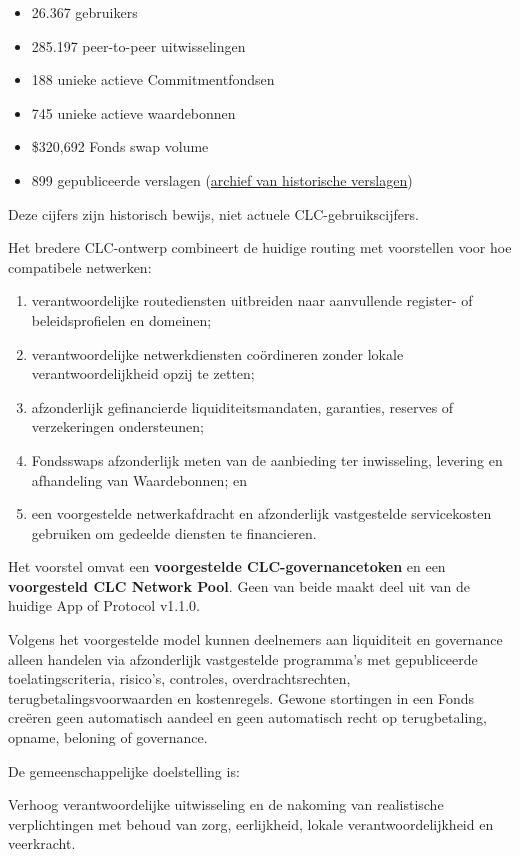 \documentclass[11pt]{article}
\begin{document}
\begin{itemize}[leftmargin=*]
\item 26.367 gebruikers
\item 285.197 peer-to-peer uitwisselingen
\item 188 unieke actieve Commitmentfondsen
\item 745 unieke actieve waardebonnen
\item \$320,692 Fonds swap volume
\item 899 gepubliceerde verslagen (\href{https://sarafu.network/reports}{archief van historische verslagen})
\end{itemize}
Deze cijfers zijn historisch bewijs, niet actuele CLC-gebruikscijfers.

Het bredere CLC-ontwerp combineert de huidige routing met voorstellen voor hoe compatibele netwerken:

\begin{enumerate}[leftmargin=*]
\item verantwoordelijke routediensten uitbreiden naar aanvullende register- of beleidsprofielen en domeinen;
\item verantwoordelijke netwerkdiensten coördineren zonder lokale verantwoordelijkheid opzij te zetten;
\item afzonderlijk gefinancierde liquiditeitsmandaten, garanties, reserves of verzekeringen ondersteunen;
\item Fondsswaps afzonderlijk meten van de aanbieding ter inwisseling, levering en afhandeling van Waardebonnen; en
\item een voorgestelde netwerkafdracht en afzonderlijk vastgestelde servicekosten gebruiken om gedeelde diensten te financieren.
\end{enumerate}
Het voorstel omvat een \textbf{voorgestelde CLC-governancetoken} en een \textbf{voorgesteld CLC Network Pool}. Geen van beide maakt deel uit van de huidige App of Protocol v1.1.0.

Volgens het voorgestelde model kunnen deelnemers aan liquiditeit en governance alleen handelen via afzonderlijk vastgestelde programma's met gepubliceerde toelatingscriteria, risico's, controles, overdrachtsrechten, terugbetalingsvoorwaarden en kostenregels. Gewone stortingen in een Fonds creëren geen automatisch aandeel en geen automatisch recht op terugbetaling, opname, beloning of governance.

De gemeenschappelijke doelstelling is:

Verhoog verantwoordelijke uitwisseling en de nakoming van realistische verplichtingen met behoud van zorg, eerlijkheid, lokale verantwoordelijkheid en veerkracht.
\end{document}
